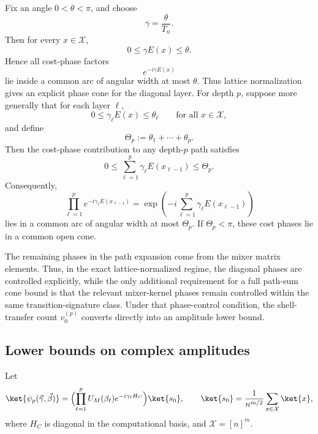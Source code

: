 \documentclass[a4paper,onecolumn,11pt,unpublished]{quantumarticle}
\theoremstyle{remark}
\begin{document}
Fix an angle \(0<\theta<\pi\), and choose
\begin{equation}
\label{eq:lattice-gamma-choice}
\gamma=\frac{\theta}{T_n}.
\end{equation}
Then for every \(x\in \mathcal X\),
\begin{equation}
\label{eq:lattice-single-layer-window}
0\le \gamma E(x)\le \theta.
\end{equation}
Hence all cost-phase factors
\[
e^{-i\gamma E(x)}
\]
lie inside a common arc of angular width at most \(\theta\). Thus lattice normalization gives an explicit phase cone for the diagonal layer. For depth \(p\), suppose more generally that for each layer \(\ell\),
\begin{equation}
\label{eq:lattice-layer-window}
0\le \gamma_\ell E(x)\le \theta_\ell
\qquad \text{for all }x\in \mathcal X,
\end{equation}
and define
\begin{equation}
\label{eq:lattice-total-cone-width}
\Theta_p:=\theta_1+\cdots+\theta_p.
\end{equation}
Then the cost-phase contribution to any depth-\(p\) path satisfies
\begin{equation}
\label{eq:lattice-path-phase-window}
0\le
\sum_{\ell=1}^{p}\gamma_\ell E(x_{\ell-1})
\le
\Theta_p.
\end{equation}
Consequently,
\begin{equation}
\label{eq:lattice-path-cost-phase}
\prod_{\ell=1}^{p}e^{-i\gamma_\ell E(x_{\ell-1})}
=
\exp\!\left(
-i\sum_{\ell=1}^{p}\gamma_\ell E(x_{\ell-1})
\right)
\end{equation}
lies in a common arc of angular width at most \(\Theta_p\). If
\(\Theta_p<\pi\), these cost phases lie in a common open cone.

The remaining phases in the path expansion come from the mixer matrix
elements. Thus, in the exact lattice-normalized regime, the diagonal phases are controlled explicitly, while the only additional requirement for a full path-sum cone bound is that the relevant mixer-kernel phases remain controlled within the same transition-signature class. Under that phase-control condition, the shell-transfer count \(v_0^{(p)}\) converts directly into an amplitude lower bound. 

\subsection{ Lower bounds on complex amplitudes}
Let
\[
\ket{\psi_p(\vec\gamma,\vec\beta)}
=
\Bigl(\prod_{\ell=1}^{p}U_M(\beta_\ell)e^{-i\gamma_\ell H_C}\Bigr)\ket{s_0},
\qquad
\ket{s_0}=\frac{1}{n^{m/2}}\sum_{x\in \mathcal X}\ket{x},
\]
where \(H_C\) is diagonal in the computational basis, and \(\mathcal X=[n]^m\).
\end{document}

